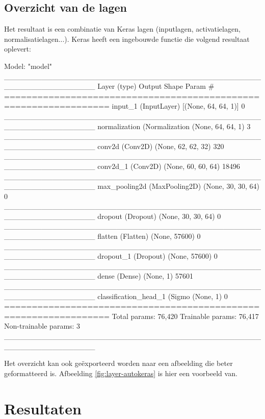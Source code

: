 \subsection{Overzicht van de lagen}
\label{subsec:model-overview}

Het resultaat is een combinatie van Keras lagen (inputlagen, activatielagen, normalisatielagen...). Keras heeft een ingebouwde functie  die volgend resultaat oplevert:

\bigskip

\begin{python}
Model: "model"
_________________________________________________________________
Layer (type)                 Output Shape              Param #   
=================================================================
input_1 (InputLayer)         [(None, 64, 64, 1)]       0         
_________________________________________________________________
normalization (Normalization (None, 64, 64, 1)         3         
_________________________________________________________________
conv2d (Conv2D)              (None, 62, 62, 32)        320       
_________________________________________________________________
conv2d_1 (Conv2D)            (None, 60, 60, 64)        18496     
_________________________________________________________________
max_pooling2d (MaxPooling2D) (None, 30, 30, 64)        0         
_________________________________________________________________
dropout (Dropout)            (None, 30, 30, 64)        0         
_________________________________________________________________
flatten (Flatten)            (None, 57600)             0         
_________________________________________________________________
dropout_1 (Dropout)          (None, 57600)             0         
_________________________________________________________________
dense (Dense)                (None, 1)                 57601     
_________________________________________________________________
classification_head_1 (Sigmo (None, 1)                 0         
=================================================================
Total params: 76,420
Trainable params: 76,417
Non-trainable params: 3
_________________________________________________________________
\end{python}

Het overzicht kan ook geëxporteerd worden naar een afbeelding die beter geformatteerd is. Afbeelding \ref{fig:layer-autokeras} is hier een voorbeeld van.

\section{Resultaten}
\label{sec:results-autokeras}


